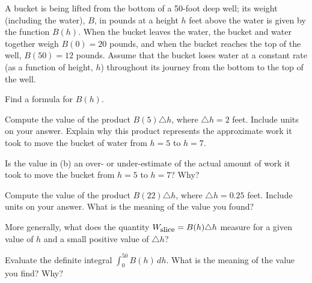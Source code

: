 \begin{pa} \label{PA:6.4}  A bucket is being lifted from the bottom of a 50-foot deep well; its weight (including the water), $B$, in pounds at a height $h$ feet above the water is given by the function $B(h)$.  When the bucket leaves the water, the bucket and water together weigh $B(0) = 20$ pounds, and when the bucket reaches the top of the well, $B(50) = 12$ pounds.  Assume that the bucket loses water at a constant rate (as a function of height, $h$) throughout its journey from the bottom to the top of the well.

\ba
	\item Find a formula for $B(h)$.
	\item Compute the value of the product $B(5) \triangle h$, where $\triangle h = 2$ feet. Include units on your answer.  Explain why this product represents the approximate work it took to move the bucket of water from $h = 5$ to $h = 7$.
	\item Is the value in (b) an over- or under-estimate of the actual amount of work it took to move the bucket from $h = 5$ to $h = 7$?  Why?
	\item Compute the value of the product $B(22) \triangle h$, where $\triangle h = 0.25$ feet.  Include units on your answer.  What is the meaning of the value you found?
	\item More generally, what does the quantity $W_{\mbox{\small{slice}}} = B(h) \triangle h$ measure for a given value of $h$ and a small positive value of $\triangle h$?
	\item Evaluate the definite integral $\int_0^{50} B(h) \, dh$.  What is the meaning of the value you find?  Why?
\ea
\end{pa} 
\afterpa